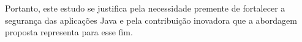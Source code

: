 Portanto, este estudo se justifica pela necessidade premente de fortalecer a segurança das aplicações Java e pela contribuição inovadora que a abordagem proposta representa para esse fim.





